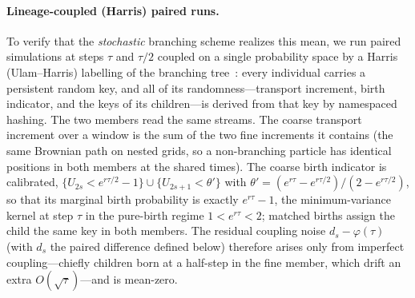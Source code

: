 \documentclass[a4paper,fleqn]{cas-sc}
\theoremstyle{definition}
\theoremstyle{remark}
\begin{document}
\paragraph{Lineage-coupled (Harris) paired runs.}
To verify that the \emph{stochastic} branching scheme realizes this mean, we run paired simulations at steps
$\tau$ and $\tau/2$ coupled on a single probability space by a Harris (Ulam--Harris) labelling of the branching
tree~\cite{harris1963branching,harris1972nearest}: every individual carries a persistent random key, and all of
its randomness---transport increment, birth indicator, and the keys of its children---is derived from that key by
namespaced hashing. The two members read the same streams. The coarse transport increment over a window is the
sum of the two fine increments it contains (the same Brownian path on nested grids, so a non-branching particle
has identical positions in both members at the shared times). The coarse birth indicator is calibrated,
$\{U_{2s}<e^{r\tau/2}-1\}\cup\{U_{2s+1}<\theta'\}$ with
$\theta'=(e^{r\tau}-e^{r\tau/2})/(2-e^{r\tau/2})$, so that its marginal birth probability is exactly
$e^{r\tau}-1$, the minimum-variance kernel at step $\tau$ in the pure-birth regime $1<e^{r\tau}<2$; matched
births assign the child the same key in both members. The residual coupling noise $d_s-\varphi(\tau)$ (with
$d_s$ the paired difference defined below) therefore arises only from imperfect coupling---chiefly children born
at a half-step in the fine member, which drift an extra $O(\sqrt\tau)$---and is mean-zero.
\end{document}

